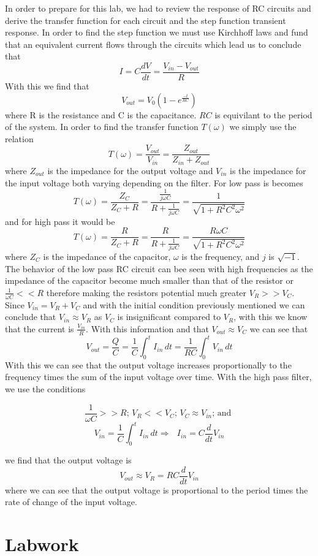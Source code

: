 \documentclass[11pt,letterpaper,onecolumn]{article}
\begin{document}
In order to prepare for this lab, we had to review the response of RC circuits and derive the transfer function for each circuit and the step function transient response. In order to find the step function we must use Kirchhoff laws and fund that an equivalent current flows through the circuits which lead us to conclude that 
$$I=C\frac{dV}{dt}= \frac{V_{in}-V_{out}}{R}$$
With this we find that
$$V_{out}=V_0(1-e^{\frac{-t}{RC}})$$
where R is the resistance and C is the capacitance. $RC$ is equivilant to the period of the system. In order to find the transfer function $T(\omega)$ we simply use the relation 
$$T(\omega) = \frac{V_{out}}{V_{in}}=\frac{Z_{out}}{Z_{in}+Z_{out}}$$
where $Z_{out}$ is the impedance for the output voltage and $V_{in}$ is the impedance for the input voltage both varying depending on the filter. For low pass is becomes 
$$T(\omega)=\frac{Z_C}{Z_C+R}=\frac{\frac{1}{j\omega C}}{R+\frac{1}{j\omega C}}=\frac{1}{\sqrt{1+R^2C^2\omega^2}}$$
and for high pass it would be
$$T(\omega)=\frac{R}{Z_C+R}=\frac{R}{R+\frac{1}{j\omega C}}=\frac{R\omega C}{\sqrt{1+R^2C^2\omega^2}}$$
where $Z_C$ is the impedance of the capacitor, $\omega$ is the frequency, and $j$ is $\sqrt{-1}$.
The behavior of the low pass RC circuit can bee seen with high frequencies as the impedance of the capacitor become much smaller than that of the resistor or $\frac{1}{\omega C}<<R$ therefore making the resistors potential much greater $V_R >> V_C$. Since $V_{in} = V_R + V_C$ and with the initial condition previously mentioned we can conclude that $V_{in} \approx V_R$ as $V_C$ is insignificant compared to $V_R$, with this we know that the current is $\frac{V_{in}}{R}$. With this information and that $V_{out} \approx V_C$ we can see that 
$$V_{out} = \frac{Q}{C}=\frac{1}{C}\int^t_0 I_{in}\,dt=\frac{1}{RC}\int^t_0 V_{in}\,dt$$
With this we can see that the output voltage increases proportionally to the frequency times the sum of the input voltage over time. With the high pass filter, we use the conditions 

$$\frac{1}{\omega C} >> R \text{; } V_R<<V_C \text{; } V_C \approx V_{in} \text{; and }$$
$$ V_{in} = \frac{1}{C}\int^t_0 I_{in}\,dt \Longrightarrow \text{ } I_{in}=C\frac{d}{dt}V_{in}$$

we find that the output voltage is
$$V_{out} \approx V_R = RC\frac{d}{dt}V_{in}$$
where we can see that the output voltage is proportional to the period times the rate of change of the input voltage.

\section{Labwork}
\end{document}
